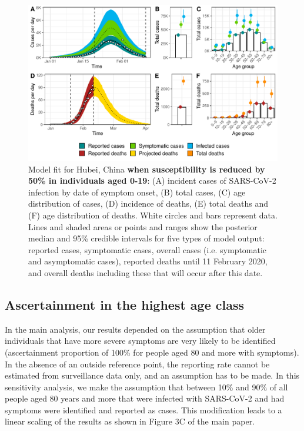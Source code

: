 \documentclass{article}
\begin{document}
\begin{figure}[H]
	\includegraphics[width=\linewidth]{../format_output/figures_v3/supp_fit_16D.pdf}
	\caption{Model fit for Hubei, China \textbf{when susceptibility is reduced by 50\% in individuals aged 0-19}: (A) incident cases of SARS-CoV-2 infection by date of symptom onset, (B) total cases, (C) age distribution of cases, (D) incidence of deaths, (E) total deaths and (F) age distribution of deaths. White circles and bars represent data. Lines and shaded areas or points and ranges show the posterior median and 95\% credible intervals for five types of model output: reported cases, symptomatic cases, overall cases (i.e. symptomatic and asymptomatic cases), reported deaths until 11 February 2020, and overall deaths including these that will occur after this date.}
\end{figure}

\clearpage
\subsection{Ascertainment in the highest age class}
	
	In the main analysis, our results depended on the assumption that older individuals that have more severe symptoms are very likely to be identified (ascertainment proportion of 100\% for people aged 80 and more with symptoms). 
	In the absence of an outside reference point, the reporting rate cannot be estimated from surveillance data only, and an assumption has to be made.
	In this sensitivity analysis, we make the assumption that between 10\% and 90\% of all people aged 80 years and more that were infected with SARS-CoV-2 and had symptoms were identified and reported as cases.
	This modification leads to a linear scaling of the results as shown in Figure 3C of the main paper. 
	
\end{document}
